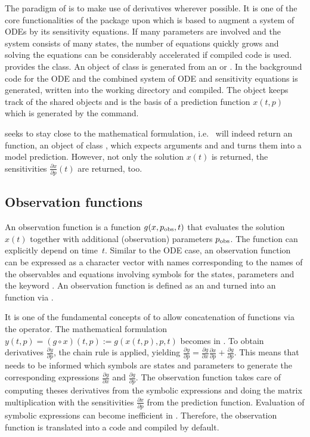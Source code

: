 \documentclass[article]{jss}
\begin{document}
The paradigm of  is to make use of derivatives wherever possible. It is one of the core functionalities of the  package upon which  is based to augment a system of ODEs by its sensitivity equations. If many parameters are involved and the system consists of many states, the number of equations quickly grows and solving the equations can be considerably accelerated if compiled code is used.  provides the  class. An object of class  is generated from an  or . In the background  code for the ODE and the combined system of ODE and sensitivity equations is generated, written into the working directory and compiled. The  object keeps track of the shared objects and is the basis of a prediction function $x(t, p)$ which is generated by the  command.

 seeks to stay close to the mathematical formulation, i.e.~ will indeed return an  function, an object of class , which expects arguments  and  and turns them into a model prediction. However, not only the solution $x(t)$ is returned, the sensitivities $\frac{\partial x}{\partial p}(t)$ are returned, too.

\subsection{Observation functions}

An observation function is a function $g(x, p_{\rm obs}, t)$ that evaluates the solution $x(t)$ together with additional (observation) parameters $p_{\rm obs}$. The function can explicitly depend on time~$t$. Similar to the ODE case, an observation function can be expressed as a character vector with names corresponding to the names of the observables and equations involving symbols for the states, parameters and the keyword . An observation function is defined as an  and turned into an  function via .

It is one of the fundamental concepts of  to allow concatenation of functions via the  operator. The mathematical formulation $y(t, p) = (g\circ x)(t, p):= g(x(t, p), p, t)$ becomes  in . To obtain derivatives $\frac{\partial y}{\partial p}$, the chain rule is applied, yielding $\frac{\partial y}{\partial p} = \frac{\partial g}{\partial x}\frac{\partial x}{\partial p} + \frac{\partial g}{\partial p}$. This means that  needs to be informed which symbols are states and parameters to generate the corresponding expressions $\frac{\partial g}{\partial x}$ and $\frac{\partial g}{\partial p}$. The observation function  takes care of computing theses derivatives from the symbolic expressions and doing the matrix multiplication with the sensitivities $\frac{\partial x}{\partial p}$ from the prediction function. Evaluation of symbolic expressions can become inefficient in . Therefore, the observation function is translated into a  code and compiled by default.
\end{document}

